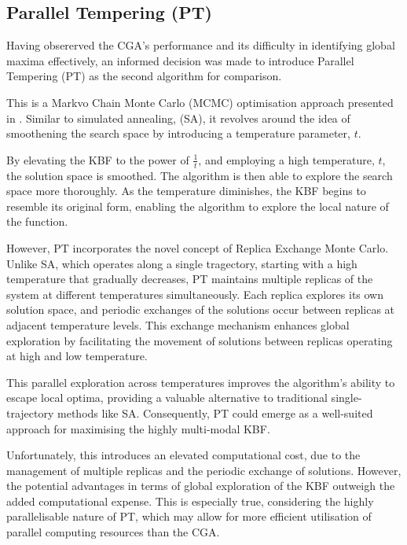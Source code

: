 \documentclass[10pt]{article}
\begin{document}
\begin{multicols}{2}

\section{Parallel Tempering (PT)}
\label{sec:PT}

Having obsererved the CGA's performance and its difficulty in identifying global maxima effectively, an informed decision was made to introduce Parallel Tempering (PT) as the second algorithm for comparison.

This is a Markvo Chain Monte Carlo (MCMC) optimisation approach presented in \cite{Earl_2005}. Similar to simulated annealing, (SA), it revolves around the idea of smoothening the search space by introducing a temperature parameter, $t$. 

By elevating the KBF to the power of $\frac{1}{t}$, and employing a high temperature, $t$, the solution space is smoothed. The algorithm is then able to explore the search space more thoroughly. As the temperature diminishes, the KBF begins to resemble its original form, enabling the algorithm to explore the local nature of the function.

However, PT incorporates the novel concept of Replica Exchange Monte Carlo. Unlike SA, which operates along a single tragectory, starting with a high temperature that gradually decreases, PT maintains multiple replicas of the system at different temperatures simultaneously. Each replica explores its own solution space, and periodic exchanges of the solutions occur between replicas at adjacent temperature levels. This exchange mechanism enhances global exploration by facilitating the movement of solutions between replicas operating at high and low temperature. 

This parallel exploration across temperatures improves the algorithm's ability to escape local optima, providing a valuable alternative to traditional single-trajectory methods like SA. Consequently, PT could emerge as a well-suited approach for maximising the highly multi-modal KBF.

Unfortunately, this introduces an elevated computational cost, due to the management of multiple replicas and the periodic exchange of solutions. However, the potential advantages in terms of global exploration of the KBF outweigh the added computational expense. This is especially true, considering the highly parallelisable nature of PT, which may allow for more efficient utilisation of parallel computing resources than the CGA. 


\end{multicols}
\end{document}
